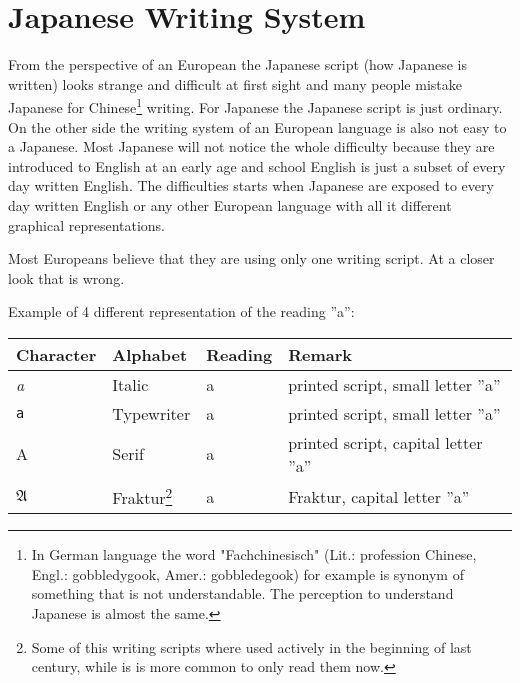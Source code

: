 \chapter{Japanese Writing System}
\label{chap:JapaneseWritingSystem}

\newcommand{\lhiragana}{\ivoc{hiragana}{平仮名}{ひらがな}{Hiragana}}
\newcommand{\lkatakana}{\ivoc{katakana}{片仮名}{かたかな}{Katakana}}

 From the perspective
of an European the Japanese script (how Japanese is written) looks strange and
difficult at first sight and many people mistake Japanese for
Chinese\footnote{In German language the word "Fachchinesisch" (Lit.: profession
Chinese, Engl.: gobbledygook, Amer.: gobbledegook) for example is synonym of
something that is not understandable. The perception to understand Japanese is
almost the same.} writing. For Japanese the Japanese script is just ordinary.
On the other side the writing system of an European language is also not easy
to a Japanese. Most Japanese will not notice the whole difficulty because they
are introduced to English at an early age and school English is just a subset
of every day written English. The difficulties starts when Japanese are exposed
to every day written English or any other European language with all it
different graphical representations.

Most Europeans believe that they are using only one writing script. At a closer
look that is wrong.

\bigskip Example of 4 different representation of the reading ''a'':

\begin{center}
\begin{tabular}{|l|l|l|l|}
\textbf{Character}&\textbf{Alphabet}&\textbf{Reading}&\textbf{Remark}\\\hline
\textit{a}     &  Italic        & a & printed script, small letter ''a'' \\
\texttt{a}     &  Typewriter    & a & printed script, small letter ''a'' \\
A              &  Serif         & a & printed script, capital letter ''a'' \\
$\mathfrak{A}$ & Fraktur\footnote{Some of this writing scripts where used
actively in the beginning of last century, while is is more common to only
read them now.}& a & Fraktur, capital letter ''a''  \\
\end{tabular}
\end{center}

